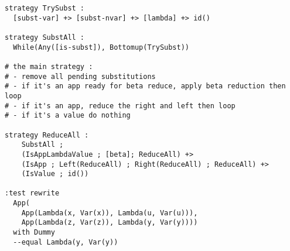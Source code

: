 \documentclass[12pt,a4paper]{article}
\begin{document}
{\begin{verbatim}
strategy TrySubst :
  [subst-var] +> [subst-nvar] +> [lambda] +> id()

strategy SubstAll :
  While(Any([is-subst]), Bottomup(TrySubst))

# the main strategy : 
# - remove all pending substitutions
# - if it's an app ready for beta reduce, apply beta reduction then loop
# - if it's an app, reduce the right and left then loop
# - if it's a value do nothing

strategy ReduceAll :
    SubstAll ;
    (IsAppLambdaValue ; [beta]; ReduceAll) +>
    (IsApp ; Left(ReduceAll) ; Right(ReduceAll) ; ReduceAll) +>
    (IsValue ; id())
    
:test rewrite 
  App(
    App(Lambda(x, Var(x)), Lambda(u, Var(u))), 
    App(Lambda(z, Var(z)), Lambda(y, Var(y))))
  with Dummy
  --equal Lambda(y, Var(y))
\end{verbatim}
}
\end{document}

